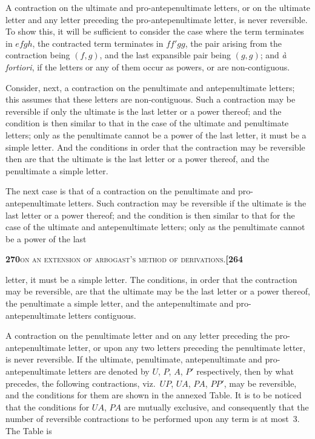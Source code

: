 \documentclass[11pt]{article}
\begin{document}
\noindent A contraction on the ultimate and pro-antepenultimate letters, or on the ultimate letter and any letter preceding the pro-antepenultimate letter, is never reversible. To show this, it will be sufficient to consider the case where the term terminates in $e f g h$, the contracted term terminates in $f f' g g$, the pair arising from the contraction being $(f, g)$, and the last expansible pair being $(g, g)$; and \textit{\`a fortiori}, if the letters or any of them occur as powers, or are non-contiguous.

\medskip

\noindent Consider, next, a contraction on the penultimate and antepenultimate letters; this assumes that these letters are non-contiguous. Such a contraction may be reversible if only the ultimate is the last letter or a power thereof; and the condition is then similar to that in the case of the ultimate and penultimate letters; only as the penultimate cannot be a power of the last letter, it must be a simple letter. And the conditions in order that the contraction may be reversible then are that the ultimate is the last letter or a power thereof, and the penultimate a simple letter.

\medskip

\noindent The next case is that of a contraction on the penultimate and pro-antepenultimate letters. Such contraction may be reversible if the ultimate is the last letter or a power thereof; and the condition is then similar to that for the case of the ultimate and antepenultimate letters; only as the penultimate cannot be a power of the last

\newpage
\setcounter{page}{270}

\noindent\textbf{270}\hfill\textsc{on an extension of arbogast's method of derivations.}\hfill\textbf{[264}

\medskip

\noindent letter, it must be a simple letter. The conditions, in order that the contraction may be reversible, are that the ultimate may be the last letter or a power thereof, the penultimate a simple letter, and the antepenultimate and pro-antepenultimate letters contiguous.

\medskip

\noindent A contraction on the penultimate letter and on any letter preceding the pro-antepenultimate letter, or upon any two letters preceding the penultimate letter, is never reversible. If the ultimate, penultimate, antepenultimate and pro-antepenultimate letters are denoted by $U$, $P$, $A$, $P'$ respectively, then by what precedes, the following contractions, viz.\ $UP$, $UA$, $PA$, $PP'$, may be reversible, and the conditions for them are shown in the annexed Table. It is to be noticed that the conditions for $UA$, $PA$ are mutually exclusive, and consequently that the number of reversible contractions to be performed upon any term is at most~3. The Table is
\end{document}
